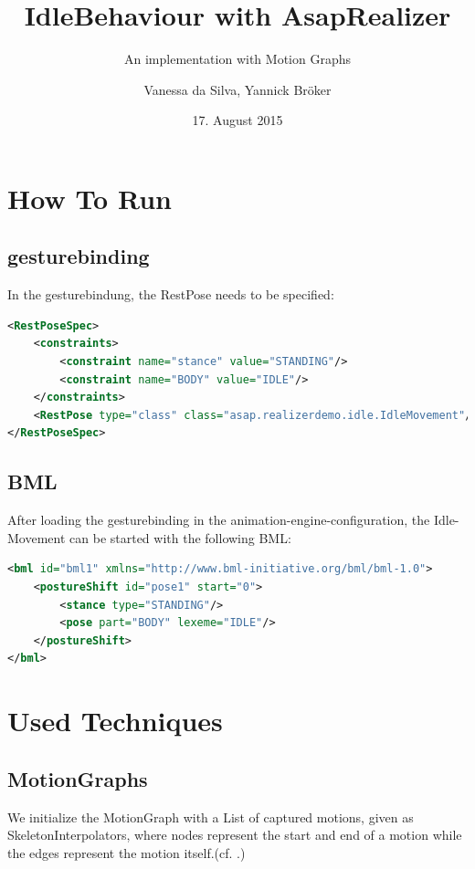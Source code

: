 \documentclass[a4paper,10pt,titlepage,bibliography=totocnumbered]{scrartcl}
\author{Vanessa da Silva, Yannick Bröker}
\title{IdleBehaviour with AsapRealizer}
\subtitle{An implementation with Motion Graphs}
\date{17. August 2015}
\newcommand*{\titleGM}{\begingroup %
\hbox{ %
\hspace*{0.2\textwidth} %
\rule{1pt}{\textheight} %
\hspace*{0.05\textwidth} %
\parbox[b]{0.75\textwidth}{ %

{\noindent\Huge\bfseries IdleBehaviour with AsapRealizer \\[0.5\baselineskip]  \huge \textcolor{gray}{An implementation with Motion Graphs}}\\[2\baselineskip] %
{\large \textit{Conversation Animation for Virtual Humans}}\\[4\baselineskip] %
{\Large \textsc{Vanessa da Silva, Yannick Bröker}} %

\vspace{0.5\textheight} %

}}
\endgroup}
\begin{document}
\begin{titlepage}
\titleGM
\end{titlepage}

\tableofcontents

\newpage

\section{How To Run}

\subsection{gesturebinding}

In the gesturebindung, the RestPose needs to be specified:

\begin{lstlisting}[language=XML]
<RestPoseSpec>
    <constraints>
        <constraint name="stance" value="STANDING"/>
        <constraint name="BODY" value="IDLE"/>
    </constraints>
    <RestPose type="class" class="asap.realizerdemo.idle.IdleMovement"/>
</RestPoseSpec>
\end{lstlisting}


\subsection{BML}

After loading the gesturebinding in the animation-engine-configuration, the Idle-Movement can be started with the following BML:

\begin{lstlisting}[language=XML]
<bml id="bml1" xmlns="http://www.bml-initiative.org/bml/bml-1.0">
    <postureShift id="pose1" start="0">
        <stance type="STANDING"/>
        <pose part="BODY" lexeme="IDLE"/>
    </postureShift>
</bml>
\end{lstlisting}
\clearpage
\section{Used Techniques}

\subsection{MotionGraphs}
\label{sec:motiongraph}
We initialize the MotionGraph with a List of captured motions, given as SkeletonInterpolators, where nodes represent the start and end of a motion while the edges represent the motion itself.(cf. .)
\end{document}
